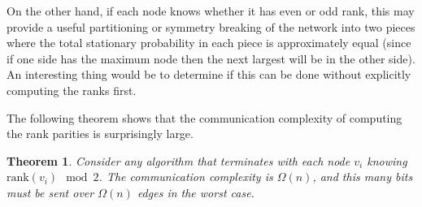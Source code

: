 \documentclass[twocolumn]{article}
\newtheorem{theorem}{Theorem}
\begin{document}
On the other hand, if each node
knows whether it has even or odd rank, this may provide a useful
partitioning or symmetry breaking of the network into two pieces where the
total stationary probability in each piece is approximately equal (since if
one side has the maximum node then the next largest will be in the other
side). An interesting thing would be to determine if this can be done
without explicitly computing the ranks first.

The following theorem shows that the communication complexity of computing the rank parities is surprisingly large.

\begin{theorem}
Consider any algorithm that terminates with each node $v_i$ knowing $\mbox{rank}(v_i) \mod 2$. The communication complexity is $\Omega(n)$, and this many bits must be sent over $\Omega(n)$ edges in the worst case.
\label{thm:rank}
\end{theorem}
\end{document}
